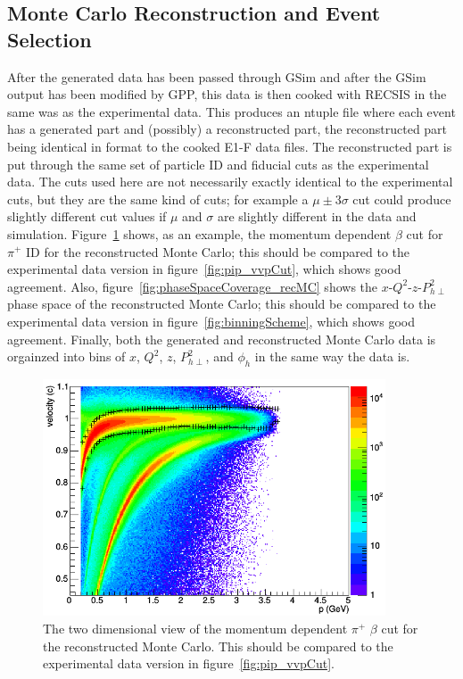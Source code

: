 \subsection{Monte Carlo Reconstruction and Event Selection}
\label{subsec:ReconstructionAndEventSelection}
%
After the generated data has been passed through GSim and after the GSim output has been modified by GPP, this data is then cooked with RECSIS in the same was as the experimental data.
This produces an ntuple file where each event has a generated part and (possibly) a reconstructed part, the reconstructed part being identical in format to the cooked E1-F data files.
The reconstructed part is put through the same set of particle ID and fiducial cuts as the experimental data.
The cuts used here are not necessarily exactly identical to the experimental cuts, but they are the same kind of cuts; for example a $\mu \pm 3\sigma$ cut could produce slightly different cut values if $\mu$ and $\sigma$ are slightly different in the data and simulation.
Figure~\ref{fig:MC_pip_vvpCut} shows, as an example, the momentum dependent $\beta$ cut for $\pi^+$ ID for the reconstructed Monte Carlo; this should be compared to the experimental data version in figure~\ref{fig:pip_vvpCut}, which shows good agreement.
Also, figure~\ref{fig:phaseSpaceCoverage_recMC} shows the $x$-$Q^2$-$z$-$P_{h\perp}^2$ phase space of the reconstructed Monte Carlo; this should be compared to the experimental data version in figure~\ref{fig:binningScheme}, which shows good agreement.
Finally, both the generated and reconstructed Monte Carlo data is orgainzed into bins of $x$, $Q^2$, $z$, $P_{h\perp}^2$, and $\phi_h$ in the same way the data is.
%
\begin{figure}[htp]
\centering
\includegraphics[width=4in]{figures/MC_pip_vvpCut.png}
\caption{The two dimensional view of the momentum dependent $\pi^+$ $\beta$ cut for the reconstructed Monte Carlo. This should be compared to the experimental data version in figure~\ref{fig:pip_vvpCut}.}
\label{fig:MC_pip_vvpCut}
\end{figure}
